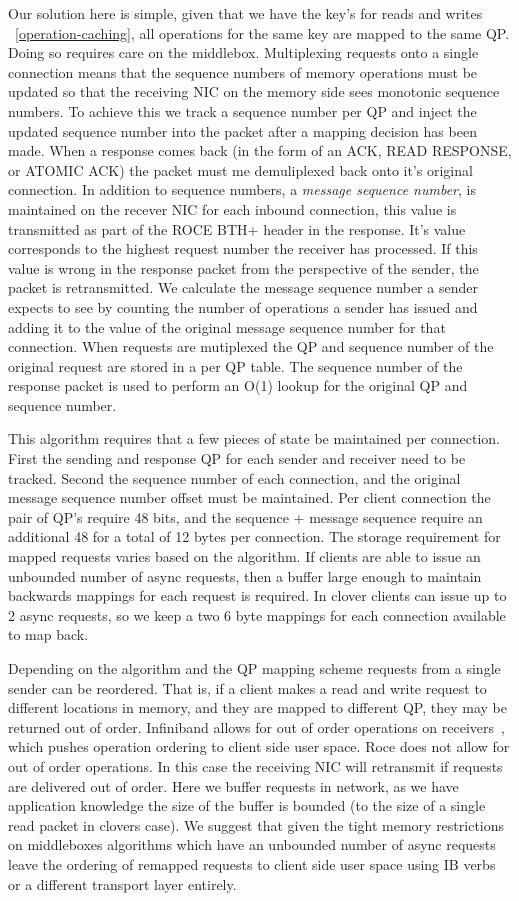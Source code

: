 Our solution here is simple, given that we have the key's for reads and writes
~\ref{operation-caching}, all operations for the same key are mapped to the same
QP. Doing so requires care on the middlebox. Multiplexing requests onto a single
connection means that the sequence numbers of memory operations must be updated
so that the receiving NIC on the memory side sees monotonic sequence numbers. To
achieve this we track a sequence number per QP and inject the updated sequence
number into the packet after a mapping decision has been made. When a response
comes back (in the form of an ACK, READ RESPONSE, or ATOMIC ACK) the packet must
me demuliplexed back onto it's original connection. In addition to sequence
numbers, a \textit{message sequence number}, is maintained on the recever NIC
for each inbound connection, this value is transmitted as part of the ROCE BTH+
header in the response. It's value corresponds to the highest request number the
receiver has processed. If this value is wrong in the response packet from the
perspective of the sender, the packet is retransmitted. We calculate the message
sequence number a sender expects to see by counting the number of operations a
sender has issued and adding it to the value of the original message sequence
number for that connection. When requests are mutiplexed the QP and sequence
number of the original request are stored in a per QP table. The sequence number
of the response packet is used to perform an O(1) lookup for the original QP and
sequence number.

This algorithm requires that a few pieces of state be maintained per connection.
First the sending and response QP for each sender and receiver need to be
tracked. Second the sequence number of each connection, and the original message
sequence number offset must be maintained. Per client connection the pair of
QP's require 48 bits, and the sequence + message sequence require an additional
48 for a total of 12 bytes per connection. The storage requirement for mapped
requests varies based on the algorithm. If clients are able to issue an
unbounded number of async requests, then a buffer large enough to maintain
backwards mappings for each request is required. In clover clients can issue up
to 2 async requests, so we keep a two 6 byte mappings for each connection
available to map back. 

Depending on the algorithm and the QP mapping scheme requests from a single
sender can be reordered. That is, if a client makes a read and write request to
different locations in memory, and they are mapped to different QP, they may be
returned out of order. Infiniband allows for out of order operations on
receivers~\cite{ib specification}, which pushes operation ordering to client
side user space. Roce does not allow for out of order operations. In this case
the receiving NIC will retransmit if requests are delivered out of order. Here
we buffer requests in network, as we have application knowledge the size of the
buffer is bounded (to the size of a single read packet in clovers case). We
suggest that given the tight memory restrictions on middleboxes algorithms which
have an unbounded number of async requests leave the ordering of remapped
requests to client side user space using IB verbs or a different transport layer
entirely.

